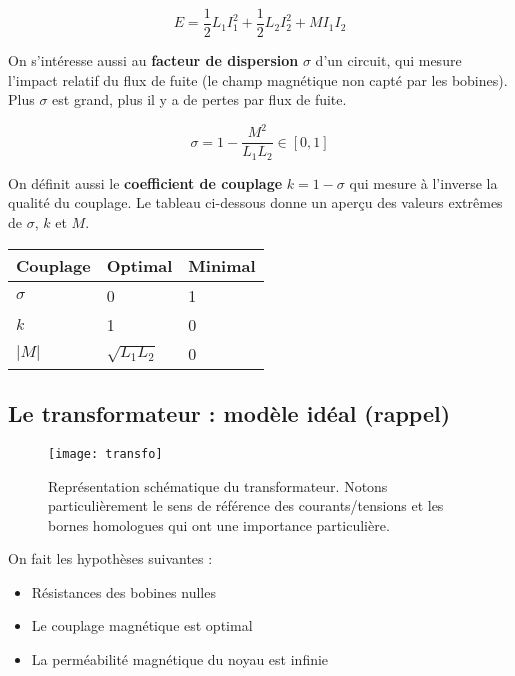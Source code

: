 \begin{equation}
E = \frac{1}{2} L_1 I_1^2 + \frac{1}{2} L_2 I_2^2 + M I_1 I_2
\end{equation}

On s'intéresse aussi au \textbf{facteur de dispersion} $\sigma$ d'un circuit, qui mesure l'impact relatif du flux de fuite (le champ magnétique non capté par les bobines). Plus $\sigma$ est grand, plus il y a de pertes par flux de fuite.

\begin{equation}
\sigma = 1 - \frac{M^2}{L_1L_2} \in [0,1]
\end{equation}

On définit aussi le \textbf{coefficient de couplage} $k = 1 - \sigma$ qui mesure à l'inverse la qualité du couplage. Le tableau ci-dessous donne un aperçu des valeurs extrêmes de $\sigma$, $k$ et $M$.

\begin{center}
    \begin{tabular}{ | l | l | l |}
    \hline
    Couplage  & Optimal & Minimal \\ \hline
    $\sigma$ & 0 & 1  \\ \hline
    $k$ & 1 & 0   \\ \hline
    $|M|$ & $\sqrt{L_1L_2}$ & 0  \\ \hline

    \end{tabular}
\end{center}


\subsection{Le transformateur : modèle idéal (rappel)}

\begin{figure}[h]
	\centering
    \texttt{[image: transfo]}
    \caption{Représentation schématique du transformateur. Notons particulièrement le sens de référence des courants/tensions et les bornes homologues qui ont une importance particulière.}
    \label{transfo}
\end{figure}


On fait les hypothèses suivantes :
\begin{itemize}
\item Résistances des bobines nulles
\item Le couplage magnétique est optimal
\item La perméabilité magnétique du noyau est infinie
\end{itemize}

